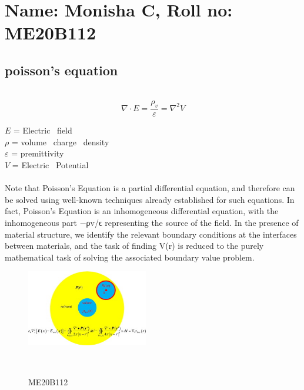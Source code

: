 \documentclass[]{article}
\begin{document}
\section{Name: Monisha C, Roll no: ME20B112}
\subsection{poisson's equation}~\cite{poisson's}
\begin{equation}
\nabla \cdot E = \frac{\rho_v}{\varepsilon} = \nabla^2 V
\end {equation}
\begin{flushleft}
$E$ = Electric \ field \\
$\rho$ = volume \ charge \ density \\
$\varepsilon$ = premittivity\\
$V$ = Electric \ Potential
\end{flushleft}

\paragraph{}
Note that Poisson’s Equation is a partial differential equation, and therefore can be solved using well-known techniques already established for such equations. In fact, Poisson’s Equation is an inhomogeneous differential equation, with the inhomogeneous part  −ρv/ϵ  representing the source of the field. In the presence of material structure, we identify the relevant boundary conditions at the interfaces between materials, and the task of finding  V(r)  is reduced to the purely mathematical task of solving the associated boundary value problem.


\begin{figure}[h]
\begin{center}
\includegraphics[width=200px]{ME20B112.jpg}
\caption{ME20B112}~\cite{me20b112}
\label{fig:poisson}
\end{center}
\end{figure}

\end{document}
